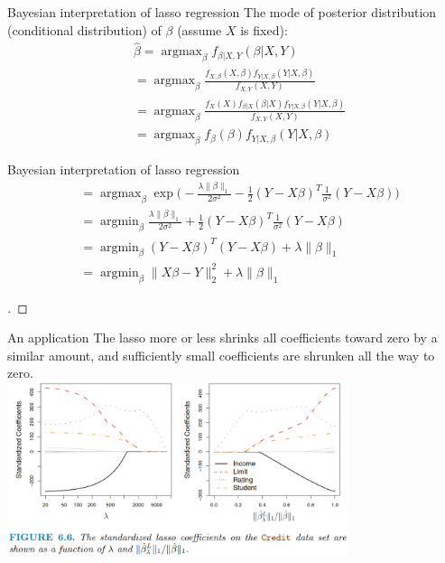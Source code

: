 \documentclass{beamer}
\begin{document}
	\begin{frame}{Bayesian interpretation of lasso regression}
		The mode of posterior distribution (conditional distribution) of $\beta$ (assume $X$ is fixed):
		\begin{align*}
			& \hat{\beta}=\mathop{\arg\max}_{\beta} f_{\beta|X,Y}(\beta|X,Y)\\
			&=\mathop{\arg\max}_{\beta} \frac{f_{X,\beta}(X,\beta)f_{Y|X,\beta}(Y|X,\beta)}{f_{X,Y}(X,Y)} \\
			&=\mathop{\arg\max}_{\beta} \frac{f_X(X)f_{\beta|X}(\beta|X)f_{Y|X,\beta}(Y|X,\beta)}{f_{X,Y}(X,Y)} \\
			&=\mathop{\arg\max}_{\beta} f_\beta(\beta)f_{Y|X,\beta}(Y|X,\beta)
		\end{align*}
	\end{frame}
	
	\begin{frame}{Bayesian interpretation of lasso regression}
		\begin{align*}
			&=\mathop{\arg\max}_{\beta} \exp \big(-\frac{\lambda\|\beta\|_1}{2\sigma^2}-\frac{1}{2}(Y-X\beta)^T\frac{1}{\sigma^2}(Y-X\beta)\big) \\
			&=\mathop{\arg\min}_{\beta} \frac{\lambda\|\beta\|_1}{2\sigma^2}+\frac{1}{2}(Y-X\beta)^T\frac{1}{\sigma^2}(Y-X\beta) \\
			&=\mathop{\arg\min}_{\beta} (Y-X\beta)^T(Y-X\beta) + \lambda \|\beta\|_1 \\
			&=\mathop{\arg\min}_{\beta} \|X\beta-Y\|_2^2 + \lambda \|\beta\|_1
		\end{align*}
		\begin{proof}[\unskip\nopunct]\end{proof}
	\end{frame}
	
	\begin{frame}{An application}
		The lasso more or less shrinks all coefficients toward zero by a similar amount, and sufficiently small coefficients are shrunken all the way to zero. \\
		\vspace{0.5cm}
		\includegraphics[width=10cm]{figure_6.6.png}
	\end{frame}
	
\end{document}
